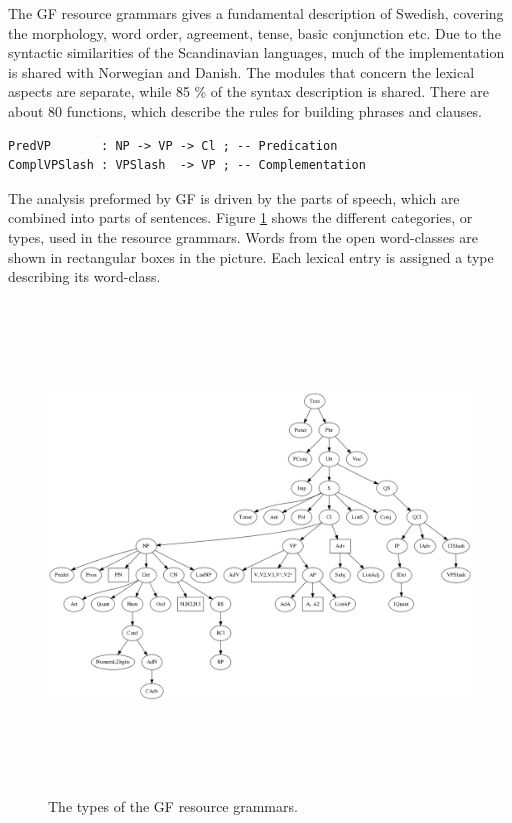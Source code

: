 \documentclass{report}
\begin{document}

The GF resource grammars gives a fundamental description of Swedish,
covering the morphology,
word order, agreement, tense, basic conjunction etc.
Due to the syntactic similarities of the Scandinavian languages, much of the implementation
is shared with Norwegian and Danish. The modules that concern the lexical
aspects are separate, while 85 \% of the syntax description is shared.
There are about 80 functions, which describe the rules for building phrases and clauses.
\begin{verbatim}
PredVP       : NP -> VP -> Cl ; -- Predication
ComplVPSlash : VPSlash  -> VP ; -- Complementation
\end{verbatim}
The analysis preformed by GF is driven by the parts of speech, which are combined into
parts of sentences.
Figure \ref{fig:gfpic} shows the different categories, or types, used in the
resource grammars. 
Words from the open word-classes are shown in rectangular boxes in
the picture. Each lexical entry is assigned a type describing its word-class.
\begin{figure}[h]
\hspace{-18mm}
\includegraphics[height=130mm]{categories.png}
\caption{The types of the GF resource grammars. }
\label{fig:gfpic}
\end{figure}
\end{document}

